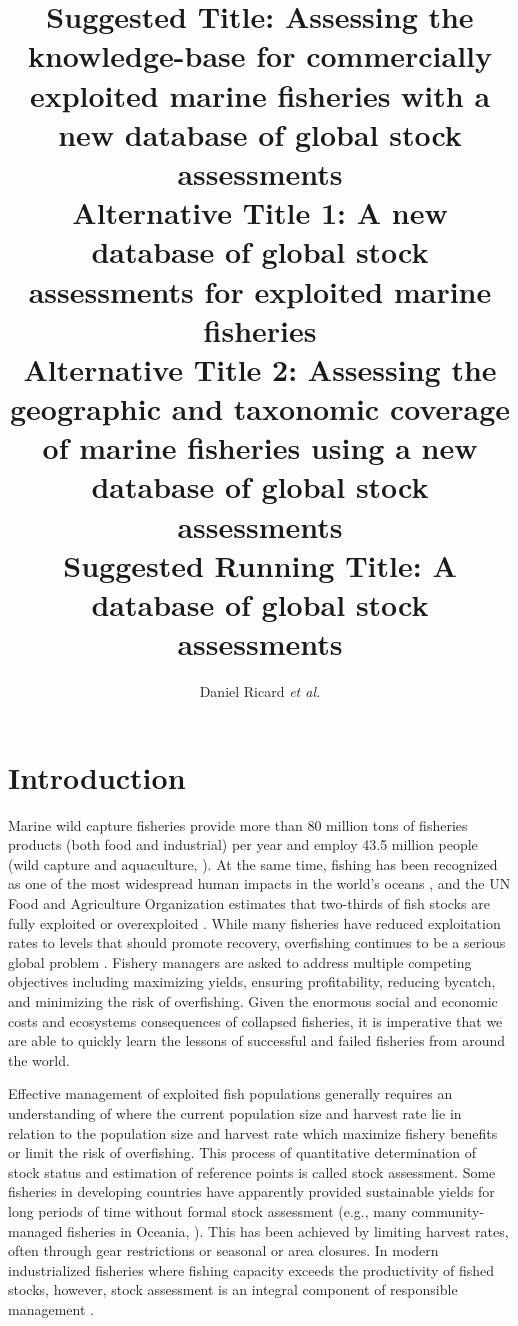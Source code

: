 \documentclass[letterpaper,12pt]{article}
\title{Suggested Title: Assessing the knowledge-base for commercially exploited marine fisheries with a new database of global stock assessments \\ \vspace{0.5cm} Alternative Title 1: A new database of global stock assessments for exploited marine fisheries \\ \vspace{0.5cm} Alternative Title 2: Assessing the geographic and taxonomic coverage of marine fisheries using a new database of global stock assessments \\ \vspace{0.5cm} Suggested Running Title: A database of global stock assessments}
\author{Daniel Ricard \textit{et al.}}
\begin{document}
\maketitle{}
\newpage




\section{Introduction}

Marine wild capture fisheries provide more than 80 million tons of
fisheries products (both food and industrial) per year and employ 43.5
million people (wild capture and aquaculture, \citet{FAO:fishstat}).
At the same time, fishing has been recognized as one of the most
widespread human impacts in the world's oceans
\citep{Halpern:etal:2008:science}, and the UN Food and Agriculture
Organization estimates that two-thirds of fish stocks are fully
exploited or overexploited \citep{FAO:fishstat}.  While many fisheries
have reduced exploitation rates to levels that should promote
recovery, overfishing continues to be a serious global problem
\citep{Worm:etal:2009:science}.  Fishery managers are asked to address
multiple competing objectives including maximizing yields, ensuring
profitability, reducing bycatch, and minimizing the risk of
overfishing.  Given the enormous social and economic costs
\citep{Rice:etal:2003:icescm} and ecosystems consequences
\citep{Frank:etal:2005:science, Myers:etal:2007:science} of collapsed
fisheries, it is imperative that we are able to quickly learn the
lessons of successful and failed fisheries from around the world.

Effective management of exploited fish populations generally requires
an understanding of where the current population size and harvest rate
lie in relation to the population size and harvest rate which maximize
fishery benefits or limit the risk of overfishing.  This process of
quantitative determination of stock status and estimation of reference
points is called stock assessment.  Some fisheries in developing
countries have apparently provided sustainable yields for long periods
of time without formal stock assessment (e.g., many community-managed
fisheries in Oceania, \citet{Johannes:2002:arees}).  This has been achieved by
limiting harvest rates, often through gear restrictions or seasonal or
area closures.  In modern industrialized fisheries where fishing
capacity exceeds the productivity of fished stocks, however, stock
assessment is an integral component of responsible
management \citep{Hilborn:Walters:1992}.
\end{document}
